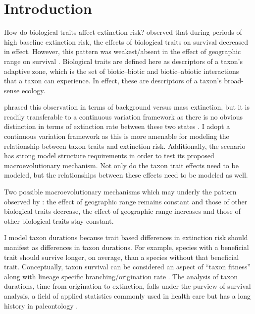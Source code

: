 \documentclass[12pt,letterpaper]{article}
\begin{document}
\section{Introduction}

How do biological traits affect extinction risk? \citet{Jablonski1986} observed that during periods of high baseline extinction risk, the effects of biological traits on survival decreased in effect. However, this pattern was weakest/absent in the effect of geographic range on survival \citep{Jablonski1986}. Biological traits are defined here as descriptors of a taxon's adaptive zone, which is the set of biotic--biotic and biotic--abiotic interactions that a taxon can experience. In effect, these are descriptors of a taxon's broad-sense ecology.

\citet{Jablonski1986} phrased this observation in terms of background versus mass extinction, but it is readily transferable to a continuous variation framework as there is no obvious distinction in terms of extinction rate between these two states \citep{Wang2003}. I adopt a continuous variation framework as this is more amenable for modeling the relationship between taxon traits and extinction risk. Additionally, the \citet{Jablonski1986} scenario has strong model structure requirements in order to test its proposed macroevolutionary mechanism. Not only do the taxon trait effects need to be modeled, but the relationships between these effects need to be modeled as well. 

Two possible macroevolutionary mechanisms which may underly the pattern observed by \citet{Jablonski1986}: the effect of geographic range remains constant and those of other biological traits decrease, the effect of geographic range increases and those of other biological traits stay constant. 

I model taxon durations because trait based differences in extinction risk should manifest as differences in taxon durations. For example, species with a beneficial trait should survive longer, on average, than a species without that beneficial trait. Conceptually, taxon survival can be considered an aspect of ``taxon fitness'' along with lineage specific branching/origination rate \citep{Cooper1984,Palmer2012}. The analysis of taxon durations, time from origination to extinction, falls under the purview of survival analysis, a field of applied statistics commonly used in health care \citep{Klein2003} but has a long history in paleontology \citep{Simpson1944,Simpson1953,VanValen1973,VanValen1979}.
\end{document}
